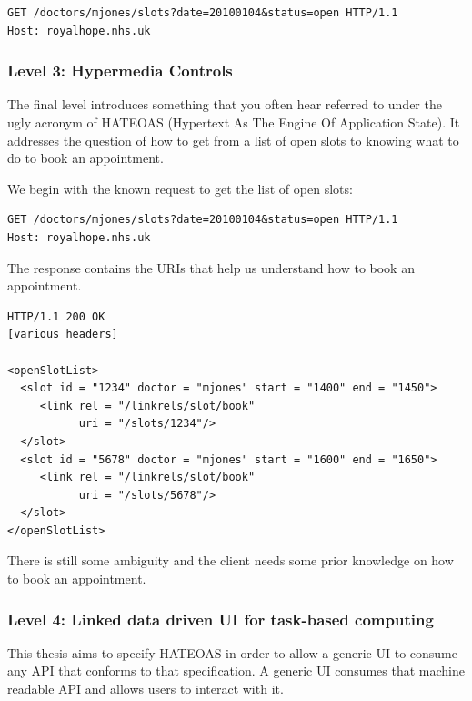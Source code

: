 \lstset{language=}
\begin{lstlisting}[caption=Level 2: Safely fetching the list of open slots using \lstinline{GET}.]
GET /doctors/mjones/slots?date=20100104&status=open HTTP/1.1
Host: royalhope.nhs.uk
\end{lstlisting}

\subsubsection{Level 3: Hypermedia Controls}
The final level introduces something that you often hear referred to under the ugly acronym of HATEOAS (Hypertext As The Engine Of Application State). It addresses the question of how to get from a list of open slots to knowing what to do to book an appointment. \citep{richardsonmaturitymodel}

We begin with the known request to get the list of open slots:

\lstset{language=}
\begin{lstlisting}[caption=Fetching the list of open slots.]
GET /doctors/mjones/slots?date=20100104&status=open HTTP/1.1
Host: royalhope.nhs.uk
\end{lstlisting}

The response contains the URIs that help us understand how to book an appointment.

\lstset{language=}
\begin{lstlisting}[caption=Level 3: The response contains information that helps us book an appointment.]
HTTP/1.1 200 OK
[various headers]

<openSlotList>
  <slot id = "1234" doctor = "mjones" start = "1400" end = "1450">
     <link rel = "/linkrels/slot/book"
           uri = "/slots/1234"/>
  </slot>
  <slot id = "5678" doctor = "mjones" start = "1600" end = "1650">
     <link rel = "/linkrels/slot/book"
           uri = "/slots/5678"/>
  </slot>
</openSlotList>
\end{lstlisting}

There is still some ambiguity and the client needs some prior knowledge on how to book an appointment.

\subsubsection{Level 4: Linked data driven UI for task-based computing}
This thesis aims to specify HATEOAS in order to allow a generic UI to consume any API that conforms to that specification. A generic UI consumes that machine readable API and allows users to interact with it.

